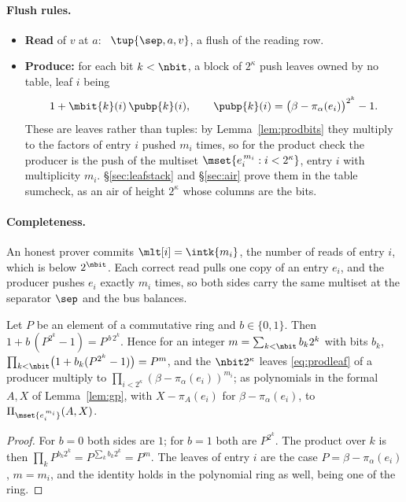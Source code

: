 \paragraph{Flush rules.}
\begin{itemize}
\item \textbf{Read} of $v$ at $a$: \pull\ $\tup{\sep,a,v}$, a flush of the reading row.
\item \textbf{Produce:} for each bit $k<\nbit$, a block of $2^{\kappa}$ push leaves owned by no table, leaf $i$ being
\begin{equation}\label{eq:prodleaf}
  1+\mbit{k}(i)\,\pubp{k}(i),\qquad \pubp{k}(i)=\bigl(\beta-\pi_\alpha(e_i)\bigr)^{2^{k}}-1 .
\end{equation}
These are leaves rather than tuples: by Lemma~\ref{lem:prodbits} they multiply to the factors of entry $i$ pushed $m_i$ times, so for the product check the producer is the push of the multiset $\mset{e_i^{\,m_i}:i<2^{\kappa}}$, entry $i$ with multiplicity $m_i$. \S\ref{sec:leafstack} and \S\ref{sec:air} prove them in the table sumcheck, as an air of height $2^{\kappa}$ whose columns are the bits.
\end{itemize}

\paragraph{Completeness.} An honest prover commits $\mlt[i]=\intk{m_i}$, the number of reads of entry $i$, which is below $2^{\nbit}$. Each correct read pulls one copy of an entry $e_i$, and the producer pushes $e_i$ exactly $m_i$ times, so both sides carry the same multiset at the separator $\sep$ and the bus balances.

\begin{lemma}\label{lem:prodbits}
Let $P$ be an element of a commutative ring and $b\in\{0,1\}$. Then $1+b\,(P^{2^{k}}-1)=P^{\,b\,2^{k}}$. Hence for an integer $m=\sum_{k<\nbit}b_k2^{k}$ with bits $b_k$, $\prod_{k<\nbit}\bigl(1+b_k(P^{2^{k}}-1)\bigr)=P^{m}$, and the $\nbit2^{\kappa}$ leaves \eqref{eq:prodleaf} of a producer multiply to $\prod_{i<2^{\kappa}}(\beta-\pi_\alpha(e_i))^{m_i}$; as polynomials in the formal $A,X$ of Lemma~\ref{lem:gp}, with $X-\pi_A(e_i)$ for $\beta-\pi_\alpha(e_i)$, to $\Pi_{\mset{e_i^{\,m_i}}}(A,X)$.
\end{lemma}

\begin{proof}
For $b=0$ both sides are $1$; for $b=1$ both are $P^{2^{k}}$. The product over $k$ is then $\prod_kP^{b_k2^{k}}=P^{\sum_kb_k2^{k}}=P^{m}$. The leaves of entry $i$ are the case $P=\beta-\pi_\alpha(e_i)$, $m=m_i$, and the identity holds in the polynomial ring as well, being one of the ring.
\end{proof}


